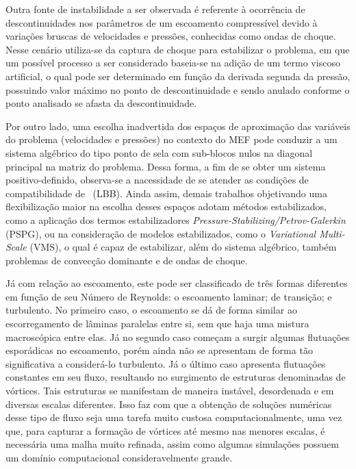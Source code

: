 Outra fonte de instabilidade a ser observada é referente à ocorrência de descontinuidades nos parâmetros de um escoamento compressível devido à variações bruscas de velocidades e pressões, conhecidas como ondas de choque. Nesse cenário utiliza-se da captura de choque para estabilizar o problema, em que um possível processo a ser considerado baseia-se na adição de um termo viscoso artificial, o qual pode ser determinado em função da derivada segunda da pressão, possuindo valor máximo no ponto de descontinuidade e sendo anulado conforme o ponto analisado se afasta da descontinuidade.

Por outro lado, uma escolha inadvertida dos espaços de aproximação das variáveis do problema (velocidades e pressões) no contexto do MEF pode conduzir a um sistema algébrico do tipo ponto de sela com sub-blocos nulos na diagonal principal na matriz do problema. Dessa forma, a fim de se obter um sistema positivo-definido, observa-se a nacessidade de se atender as condições de compatibilidade de \LBB\ (LBB). Ainda assim, demais trabalhos objetivando uma flexibilização maior na escolha desses espaços adotam métodos estabilizados, como a aplicação dos termos estabilizadores \textit{Pressure-Stabilizing/Petrov-Galerkin} (PSPG), ou na consideração de modelos estabilizados, como o \textit{Variational Multi-Scale} (VMS), o qual é capaz de estabilizar, além do sistema algébrico, também problemas de convecção dominante e de ondas de choque.


Já com relação ao escoamento, este pode ser classificado de três formas diferentes em função de seu Número de Reynolds: o escoamento laminar; de transição; e turbulento. No primeiro caso, o escoamento se dá de forma similar ao escorregamento de lâminas paralelas entre si, sem que haja uma mistura macroscópica entre elas. Já no segundo caso começam a surgir algumas flutuações esporádicas no escoamento, porém ainda não se apresentam de forma tão significativa a considerá-lo turbulento. Já o último caso apresenta flutuações constantes em seu fluxo, resultando no surgimento de estruturas denominadas de vórtices. Tais estruturas se manifestam de maneira instável, desordenada e em diversas escalas diferentes. Isso faz com que a obtenção de soluções numéricas desse tipo de fluxo seja uma tarefa muito custosa computacionalmente, uma vez que, para capturar a formação de vórtices até mesmo nas menores escalas, é necessária uma malha muito refinada, assim como algumas simulações possuem um domínio computacional consideravelmente grande.

